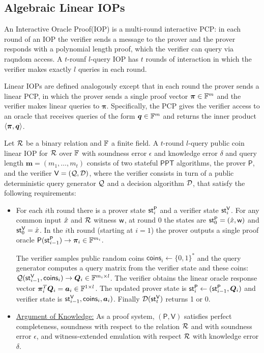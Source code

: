 \documentclass[runningheads]{llncs}
\def\bitset{\{0,1\}}
\def\ppt{\mathsf{PPT}}
\def\prover{\mathsf{P}}
\def\verifier{\mathsf{V}}
\def\coins{\mathsf{coins}}
\begin{document}
\subsection{Algebraic Linear IOPs}
An Interactive Oracle Proof(IOP)\cite{BCS16, RRR16} is a multi-round interactive PCP: in each round of an IOP the verifier sends a message to the prover and the prover responds with a polynomial length proof, which the verifier can query via raqndom access.
A $t$-rounf $l$-query IOP has $t$ rounds of interaction in which the verifier makes exactly $l$ queries in each round.

Linear IOPs\cite{BBC+19} are defined analogously except that in each round the prover sends a linear PCP\cite{IKO07}, in which the prover sends a single proof vector $\bm{\pi} \in \mathbb{F}^m$ and the verifier makes linear queries to $\bm{\pi}$. Specifically, the PCP gives the verifier access to an oracle that receives queries of the form $\bm{q}\in\mathbb{F}^m$ and returns the inner product $\langle \bm{\pi},\bm{q}\rangle$.

\begin{definition}\label{defn:linearIOP}
	Let $\mathcal{R}$ be a binary relation and $\mathbb{F}$ a finite field. A $t$-round $l$-query public coin linear IOP for $\mathcal{R}$ over $\mathbb{F}$ with soundness error $\epsilon$ and knowledge error $\delta$ and query length $\bm{m}=(m_1,\ldots, m_t)$ consists of two stateful $\ppt$ algorithms, the prover $\prover$, and the verifier $\verifier = (\calQ, \calD)$, where the verifier consists in turn of a public deterministic query generator $\mathcal{Q}$ and a decision algorithm $\mathcal{D}$, that satisfy the following requirements:
	\begin{itemize}
		\item For each $i$th round there is a prover state $\st^{\prover}_i$ and a verifier state $\st^{\verifier}_i$. For any common input $\hat{x}$ and $\mathcal{R}$ witness $\mathsf{w}$, at round 0 the states are $\st^{\prover}_0 = (\stmt, \wit)$ and $\st^{\verifier}_0 = \stmt$. In the $i$th round (starting at $i=1$) the prover outputs a single proof oracle $\prover(\st^{\prover}_{i-1})\rightarrow \bm{\pi}_i \in \bbF^{m_i}$.
		
		The verifier samples public random coins $\coins_i \leftarrow \bitset^*$ and the query generator computes a query matrix from the verifier state and these coins: $\calQ(\st^{\verifier}_{i-1}, \coins_i)\rightarrow \bm{Q}_i \in \bbF^{m_i\times l}$. The verifier obtains the linear oracle response vector $\bm{\pi}_i^T\bm{Q}_i = \bm{a}_i \in \mathbb{F}^{1\times l}$. The updated prover state is $\st^{\prover}_i\leftarrow (\st^{\prover}_{i-1}, \bm{Q}_i)$ and verifier state is $\st^{\verifier}_{i-1}, \coins_i, \bm{a}_i)$. Finally $\calD(\st^{\verifier}_t)$ returns 1 or 0.
		
		\item \underline{Argument of Knowledge:} As a proof system, $(\prover, \verifier)$ satisfies perfect completeness, soundness with respect to the relation $\mathcal{R}$ and with soundness error $\epsilon$, and witness-extended emulation with respect $\mathcal{R}$ with knowledge error $\delta$.
	\end{itemize}
\end{definition}
\end{document}
